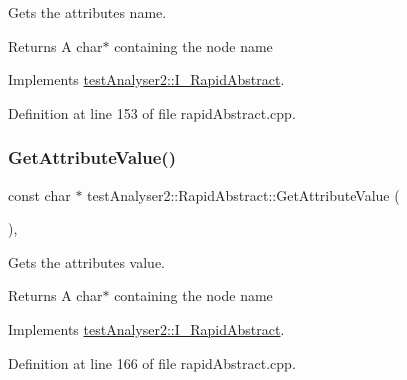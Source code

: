 Gets the attribute\textquotesingle{}s name. 

\begin{DoxyReturn}{Returns}
A char$\ast$ containing the node name 
\end{DoxyReturn}


Implements \mbox{\hyperlink{classtestAnalyser2_1_1I__RapidAbstract_a70d3e89ca2966dfb205084a1cf1f9f1f}{test\+Analyser2\+::\+I\+\_\+\+Rapid\+Abstract}}.



Definition at line 153 of file rapid\+Abstract.\+cpp.

\mbox{\label{classtestAnalyser2_1_1RapidAbstract_abdb39cb9f3d094518d8d3fcfb1ae0d64}} 
\subsubsection{\texorpdfstring{GetAttributeValue()}{GetAttributeValue()}}
{\footnotesize\ttfamily const char $\ast$ test\+Analyser2\+::\+Rapid\+Abstract\+::\+Get\+Attribute\+Value (\begin{DoxyParamCaption}{ }\end{DoxyParamCaption})\hspace{0.3cm}{\ttfamily [override]}, {\ttfamily [virtual]}}



Gets the attribute\textquotesingle{}s value. 

\begin{DoxyReturn}{Returns}
A char$\ast$ containing the node name 
\end{DoxyReturn}


Implements \mbox{\hyperlink{classtestAnalyser2_1_1I__RapidAbstract_a530a07423a4a8d9afc6222ad41d4879e}{test\+Analyser2\+::\+I\+\_\+\+Rapid\+Abstract}}.



Definition at line 166 of file rapid\+Abstract.\+cpp.

\mbox{\label{classtestAnalyser2_1_1RapidAbstract_a42fff5c266c24f6149f84f3b024457c7}} 
